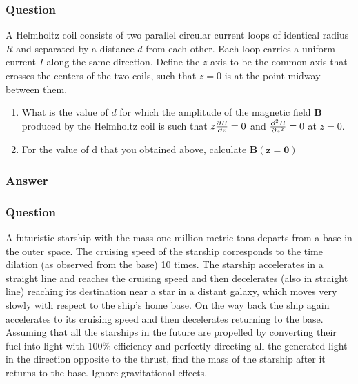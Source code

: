 \subsubsection{Question}
A Helmholtz coil consists of two parallel circular current loops of identical radius $R$ and separated by a distance $d$ from each other. Each loop carries a uniform current $I$ along the same direction. Define the $z$ axis to be the common axis that crosses the centers of the two coils, such that $z=0$ is at the point midway between them.
\begin{enumerate}
	\item What is the value of $d$ for which the amplitude of the magnetic field $\boldsymbol{B}$ produced by the Helmholtz coil is such that $z\pdv{B}{z}=0$ and $\pdv[2]{B}{z}=0$ at $z=0$.
	\item For the value of d that you obtained above, calculate $\boldsymbol{B}(\boldsymbol{z}=\boldsymbol{0})$
\end{enumerate}
\subsubsection{Answer}



\subsubsection{Question}

A futuristic starship with the mass one million metric tons departs from a base in the outer space. The cruising speed of the starship corresponds to the time dilation (as observed from the base) 10 times. The starship accelerates in a straight line and reaches the cruising speed and then decelerates (also in straight line) reaching its destination near a star in a distant galaxy, which moves very slowly with respect to the ship’s home base. On the way back the ship again accelerates to its cruising speed and then decelerates returning to the base. Assuming that all the starships in the future are propelled by converting their fuel into light with 100\% efficiency and perfectly directing all the generated light in the direction opposite to the thrust, find the mass of the starship after it returns to the base. Ignore gravitational effects.
